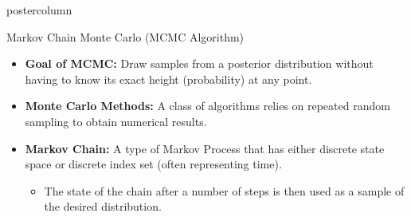 \documentclass[final]{beamer}\usepackage[]{graphicx}\usepackage[]{color}
\newcommand{\red}{\textcolor{red}}
\begin{document}
{\begin{frame}
\begin{columns}
\begin{column}{.33\textwidth}
\begin{beamercolorbox}[center,wd=\textwidth]{postercolumn}
\begin{minipage}[T]{.97\textwidth}
{%
\begin{block}{Markov Chain Monte Carlo (MCMC Algorithm)}


	\begin{itemize}
			\item \textbf{Goal of MCMC:} Draw samples from a posterior distribution without having to know its exact height (probability) at any point.
			\vspace{0.3cm}
		\item \textbf{Monte Carlo Methods:} A class of algorithms relies on repeated random sampling to obtain numerical results.
		\vspace{0.3cm}
 		\item \textbf{Markov Chain:} A type of Markov Process that has either discrete state space or discrete index set (often representing time).

			\begin{itemize}
	  	\item	The state of the chain after a number of steps is then used as a sample of the desired distribution.
		  \end{itemize}
		  \vspace{0.2cm}
		  
	 
	  
		  
		

\end{itemize}
\end{block}}
\end{minipage}
\end{beamercolorbox}
\end{column}
\end{columns}
\end{frame}}
\end{document}
